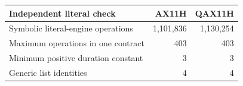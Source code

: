 \begin{center}\begin{tabular}{lrr}
\toprule
Independent literal check & AX11H & QAX11H\\
\midrule
Symbolic literal-engine operations & 1,101,836 & 1,130,254\\
Maximum operations in one contract & 403 & 403\\
Minimum positive duration constant & 3 & 3\\
Generic list identities & 4 & 4\\
\bottomrule
\end{tabular}\end{center}
